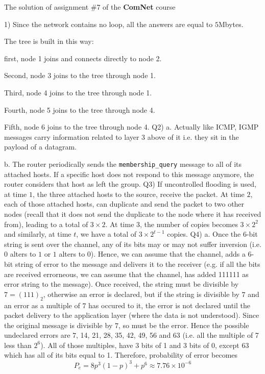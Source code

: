 \documentclass[10pt,letterpaper]{article}
\begin{document}
\Large
\begin{center}
The solution of assignment \#7 of the \textbf{ComNet} course
\end{center}
1) Since the network contains no loop, all the answers are equal to $5$Mbytes.

The tree is built in this way: 

first, node 1 joins and connects directly to node 2.

Second, node 3 joins to the tree through node 1.

Third, node 4 joins to the tree through node 1.

Fourth, node 5 joins to the tree through node 4.

Fifth, node 6 joins to the tree through node 4.
\newline\newline
Q2) a. Actually like ICMP, IGMP messages carry information related to layer 3 above of it i.e. they sit in the payload of a datagram.

b. The router periodically sends the \texttt{membership\_query} message to all of its attached hosts. If a specific host does not respond to this message anymore, the router considers that host as left the group.
\newline\newline
Q3) If uncontrolled flooding is used, at time $1$, the three attached hosts to the source, receive the packet. At time $2$, each of those attached hosts, can duplicate and send the packet to two other nodes (recall that it does not send the duplicate to the node where it has received from), leading to a total of $3\times 2$. At time $3$, the number of copies becomes $3\times 2^2$ and similarly, at time $t$, we have a total of $3\times 2^{t-1}$ copies.
\newline\newline
Q4) a. Once the $6$-bit string is sent over the channel, any of its bits may or may not suffer inversion (i.e. $0$ alters to $1$ or $1$ alters to 0). Hence, we can assume that the channel, adds a $6$-bit string of error to the message and delivers it to the receiver (e.g. if all the bits are received errorneous, we can assume that the channel, has added 111111 as error string to the message). Once received, the string must be divisible by $7=(111)_2$, otherwise an error is declared, but if the string is divisible by $7$ and an error as a multiple of $7$ has occured to it, the error is not declared until the packet delivery to the application layer (where the data is not understood). Since the original message is divisible by $7$, so must be the error. Hence the possible undeclared errors are $7$, 14, 21, 28, 35, 42, 49, 56 and 63 (i.e. all the multiple of 7 less than $2^6$). All of those multiples, have 3 bits of 1 and 3 bits of 0, except 63 which has all of its bits equal to 1. Therefore, probability of error becomes
$$
P_e=8p^3(1-p)^3+p^6\approx 7.76\times 10^{-6}
$$
\end{document}
